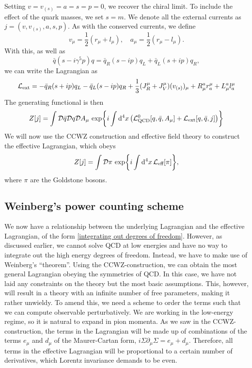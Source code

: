 Setting $v = v_{(s)} = a = s = p = 0$, we recover the chiral limit.
To include the effect of the quark masses, we set $s = m$.
We denote all the external currents as $j = (v, v_{(s)}, a, s, p )$.
As with the conserved currents, we define
\begin{equation}
    v_\mu = \frac{1}{2}(r_\mu + l_\mu),
    \quad
    a_\mu = \frac{1}{2}(r_\mu - l_\mu).
\end{equation}
With this, as well as 
\begin{equation}
    \bar q (s - i \gamma^5 p) q
    = \bar q_R (s - i p) q_L + \bar q_L (s + i p) q_R,
\end{equation}
we can write the Lagrangian as
\begin{equation}
    \mathcal{L}_\text{ext} 
    = - \bar q_R (s + i p) q_L - \bar q_L (s - i p) q_R
    + \frac{1}{3} (J_R^\mu + J_V^\mu)(v_{(s)})_\mu
    + R_\mu^a r^\mu_a + L_\mu^a l^\mu_a
\end{equation}
The generating functional is then
\begin{equation}
    Z[j] 
    = 
    \int \mathcal{D} \bar q \mathcal{D} q \mathcal{D} A_\mu \, 
    \exp{
        i \int \dd^4 x 
        \left( 
            \mathcal{L}^0_\text{QCD}[q, \bar q, A_\mu] + \mathcal{L}_\text{ext}[q, \bar q, j]
        \right)
    }
\end{equation}
We will now use the CCWZ construction and effective field theory to construct the effective Lagrangian, which obeys
\begin{equation}
    Z[j] = \int \mathcal{D} \pi \, \exp{i \int \dd^4 x \, \mathcal{L}_\text{eff}[\pi]},
\end{equation}
where $\pi$ are the Goldstone bosons.

\subsection*{Weinberg's power counting scheme}
\label{subsection:power counting}

We now have a relationship between the underlying Lagrangian and the effective Lagrangian, of the form \autoref{integrating out degrees of freedom}.
However, as discussed earlier, we cannot solve QCD at low energies and have no way to integrate out the high energy degrees of freedom.
Instead, we have to make use of Weinberg's ``theorem''.
Using the CCWZ-construction, we can obtain the most general Lagrangian obeying the symmetries of QCD. 
In this case, we have not laid any constraints on the theory but the most basic assumptions.
This, however, will result in a theory with an infinite number of free parameters, making it rather unwieldy.
To amend this, we need a scheme to order the terms such that we can compute observable perturbatively.
We are working in the low-energy regime, so it is natural to expand in pion momenta.
As we saw in the CCWZ-construction, the terms in the Lagrangian will be made up of combinations of the terms $e_\mu$ and $d_\mu$ of the Maurer-Cartan form, $i\Sigma \partial_\mu \Sigma = e_\mu + d_\mu$.
Therefore, all terms in the effective Lagrangian will be proportional to a certain number of derivatives, which Lorentz invariance demands to be even.

